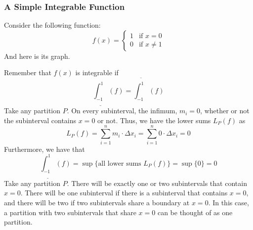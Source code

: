 \documentclass[10pt]{article}
\begin{document}
\subsubsection{A Simple Integrable Function}
Consider the following function:
$$
    f(x)=\begin{cases}1&\text{if $x=0$} \\ 0&\text{if $x\neq 1$}\end{cases}
$$
And here is its graph.
\begin{center}
\end{center}
Remember that $f(x)$ is integrable if
$$
    \underline{\int_{-1}^{1}}(f)=\overline{\int_{-1}^{1}}(f)
$$
Take any partition $P$. On every subinterval, the infimum, $m_i=0$, whether or not the subinterval contains $x=0$ or not. Thus, we have the lower sums $L_P(f)$ as
$$
    L_P(f)=\sum_{i=1}^n m_i\cdot \Delta x_i=\sum_{i=1}^n 0\cdot\Delta x_i=0
$$
Furthermore, we have that
$$
    \underline{\int_{-1}^{1}}(f)=\sup\{\text{all lower sums $L_P(f)$}\}=\sup\{0\}=0
$$
Take any partition $P$. There will be exactly one or two subintervals that contain $x=0$. There will be one subinterval if there is a subinterval that contains $x=0$, and there will be two if two subintervals share a boundary at $x=0$. In this case, a partition with two subintervals that share $x=0$ can be thought of as one partition.
\begin{center}
\end{center}
\end{document}
